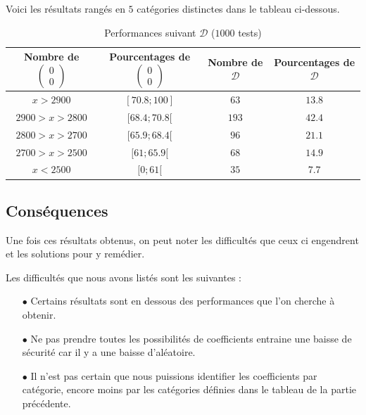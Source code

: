 \documentclass[12pt, a4paper]{memoir}
\newcommand{\doublezero}{\begin{pmatrix} 0 \\ 0 \end{pmatrix}}
\begin{document}
  Voici les résultats rangés en $5$ catégories distinctes dans le tableau ci-dessous.
  
\begin{table}[htbp]
\caption{Performances suivant $\mathcal{D}$ ($1000$ tests) }
\begin{center}
\begin{tabular}{cccc}
\toprule
Nombre de $\doublezero$ & Pourcentages de $\doublezero$ & Nombre de $\mathcal{D}$ & Pourcentages de $\mathcal{D}$ \\
\midrule
$x > 2900$ & $[70.8;100]$ & $63$  & $13.8$ \\
$2900 > x > 2800$ & $[68.4;70.8[$ & $193$ & $42.4$ \\
$2800 > x > 2700$ & $[65.9;68.4[$ & $96$ & $21.1$ \\
$2700 > x > 2500$ & $[61;65.9[$ & $68$ & $14.9$ \\
$x < 2500$ & $[0;61[$ & $35$ & $7.7$ \\
\bottomrule
\end{tabular}
\end{center}
\label{tab:example}
\end{table}%

  \subsection{Conséquences}
  
  Une fois ces résultats obtenus, on peut noter les difficultés que ceux ci engendrent et les solutions pour y remédier.
  
  Les difficultés que nous avons listés sont les suivantes :
  \begin{itemize}
   \item [$\bullet$] Certains résultats sont en dessous des performances que l'on cherche à obtenir.
   \item [$\bullet$] Ne pas prendre toutes les possibilités de coefficients entraine une baisse de sécurité car 
   il y a une baisse d'aléatoire.
   \item [$\bullet$] Il n'est pas certain que nous puissions identifier les coefficients par catégorie, encore moins
   par les catégories définies dans le tableau de la partie précédente.
  \end{itemize}
  
\end{document}
